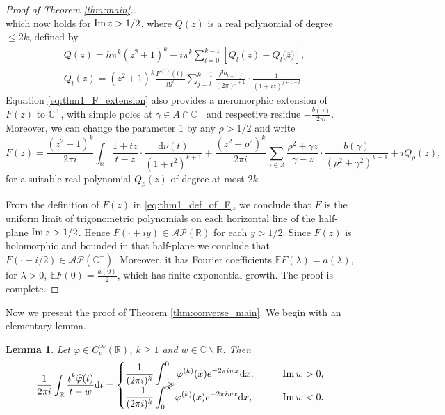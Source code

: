 \documentclass[a4paper,reqno,12pt]{amsart}
\newtheorem{lemma}[theorem]{Lemma}
\newcommand{\A}{\mathcal{A}}
\renewcommand{\P}{\mathcal{P}}
\renewcommand{\r}{\mathbb{R}}
\newcommand{\cp}{\mathbb{C}} %
\newcommand{\ft}{\widehat}
\newcommand{\la}{\lambda}
\newcommand{\ga}{\gamma}
\newcommand{\p}{\varphi}
\renewcommand{\d}{\mathrm{d}}
\newcommand{\ov}[1]{\overline{#1}}
\newcommand{\cd}{\cdot}
\newcommand{\1}{{\bf 1}}
\newcommand{\e}{\mathbb{E}}
\renewcommand{\Im}{{\rm Im}\,}
\begin{document}
\begin{proof}[Proof of Theorem \ref{thm:main}.]
\begin{equation}
\end{equation}
which now holds for $\Im{z}>1/2$, where $Q(z)$ is a real polynomial of degree $\leq 2k$, defined by
\begin{align*}
    &Q(z)=h\pi^k(z^2+1)^k-i\pi^k\sum_{l=0}^{k-1} \left[Q_l(z)-\ov{Q_l{(\ov{z}})}\right],\\
    &Q_l(z)=(z^2+1)^k\frac{F^{(l)}(i)}{l!i^l}\sum_{j=l}^{k-1} \frac{j!b_{k-1,j}}{(2\pi)^{j+1}}\cd\frac{1}{(1+iz)^{j+1-l}}.
\end{align*}
Equation \eqref{eq:thm1_F_extension} also provides a meromorphic extension of $F(z)$ to $\cp^+$, with simple poles at $\ga\in A\cap\cp^+$ and respective residue $-\frac{b(\ga)}{2\pi i}$. Moreover, we can change the parameter 1 by any $\rho>1/2$ and write
\begin{equation*}
    F(z)=\frac{(z^2+1)^k}{2\pi i} \int_{\r} \frac{1+tz}{t-z}\cd \frac{\d\nu(t)}{(1+t^2)^{k+1}}+\frac{(z^2+\rho^2)^k}{2\pi i} \sum_{\ga\in A} \frac{\rho^2+\ga z}{\ga-z}\cd \frac{b(\ga)}{(\rho^2+\ga^2)^{k+1}}+iQ_\rho(z),
\end{equation*}
for a suitable real polynomial $Q_\rho(z)$ of degree at most $2k$.

From the definition of $F(z)$ in \eqref{eq:thm1_def_of_F}, we conclude that $F$ is the uniform limit of trigonometric polynomials on each horizontal line of the half-plane $\Im{z}>1/2$. Hence $F(\cd+iy)\in\A\P(\r)$ for each $y>1/2$. Since $F(z)$ is holomorphic and bounded in that half-plane we conclude that $F(\cd+i/2)\in\A\P(\cp^+)$. Moreover, it has Fourier coefficients $\e F(\la)=a(\la)$, for $\la>0$, $\e F(0)=\frac{a(0)}{2}$, which has finite exponential growth. The proof is complete.  
\end{proof}
Now we present the proof of Theorem \ref{thm:converse_main}. We begin with an elementary lemma.
\begin{lemma}
    \label{lemma:Cauchy_integral}
    Let $\p\in C^\infty_c(\r)$, $k\geq1$ and $w\in\cp\backslash\r$. Then
    \begin{align}
        \frac{1}{2\pi i} \int_{\r} \frac{t^k\ft{\p}(t)}{t-w}\d t=\begin{cases}
            \displaystyle\frac{1}{(2\pi i)^k} \int_{-\infty}^{0} \p^{(k)}(x)e^{-2\pi iwx}\d x,\qquad &\Im{w}>0,\\
            \displaystyle\frac{-1}{(2\pi i)^k} \int_{0}^{\infty} \p^{(k)}(x)e^{-2\pi iwx}\d x,\qquad &\Im{w}<0.
        \end{cases}
    \end{align}
\end{lemma}
\end{document}
